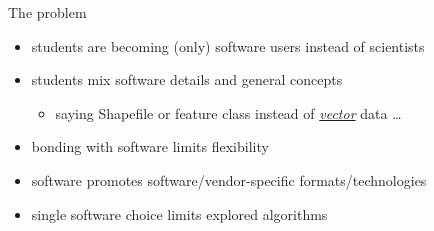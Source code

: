 \documentclass[xcolor={dvipsnames,usenames},beamer]{beamer}
\begin{document}
\begin{frame}{The problem}



\begin{itemize}
 \item students are becoming (only) software users instead of scientists
 \item students mix software details and general concepts
 \begin{itemize}
  \item saying Shapefile or feature class instead of
    \href{http://www.opengeospatial.org/ogc/glossary/v}{\emph{vector}} data%
    \ldots
\end{itemize}
 \item bonding with software limits flexibility
 \item software promotes software/vendor-specific formats/technologies
 \item single software choice limits explored algorithms

\end{itemize}

\end{frame}
\end{document}
